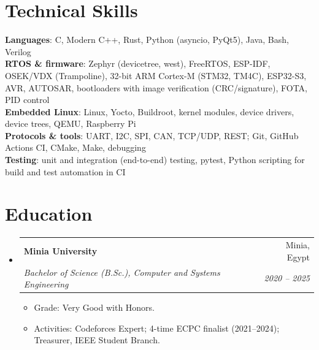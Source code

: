 \documentclass[letterpaper,11pt]{article}
\makeatletter
\newcommand{\resumeItem}[1]{
  \item\small{
    {#1 \vspace{-2pt}}
  }
}
\newcommand{\resumeSubheading}[4]{
  \vspace{-2pt}\item
    \begin{tabular*}{0.97\textwidth}[t]{l@{\extracolsep{\fill}}r}
      \textbf{#1} & #2 \\
      \textit{\small#3} & \textit{\small #4} \\
    \end{tabular*}\vspace{-7pt}
}
\newcommand{\resumeSubHeadingListStart}{\begin{itemize}[leftmargin=0.15in, label={}]}
\newcommand{\resumeSubHeadingListEnd}{\end{itemize}}
\newcommand{\resumeItemListStart}{\begin{itemize}}
\newcommand{\resumeItemListEnd}{\end{itemize}\vspace{-5pt}}
\makeatother
\begin{document}
\section{Technical Skills}
 \begin{itemize}[leftmargin=0.15in, label={}]
    \small{\item{
     \textbf{Languages}{: C, Modern C++, Rust, Python (asyncio, PyQt5), Java, Bash, Verilog} \\
     \textbf{RTOS \& firmware}{: Zephyr (devicetree, west), FreeRTOS, ESP-IDF, OSEK/VDX (Trampoline), 32-bit ARM Cortex-M (STM32, TM4C), ESP32-S3, AVR, AUTOSAR, bootloaders with image verification (CRC/signature), FOTA, PID control} \\
     \textbf{Embedded Linux}{: Linux, Yocto, Buildroot, kernel modules, device drivers, device trees, QEMU, Raspberry Pi} \\
     \textbf{Protocols \& tools}{: UART, I2C, SPI, CAN, TCP/UDP, REST; Git, GitHub Actions CI, CMake, Make, debugging} \\
     \textbf{Testing}{: unit and integration (end-to-end) testing, pytest, Python scripting for build and test automation in CI}
    }}
 \end{itemize}

\section{Education}
  \resumeSubHeadingListStart
    \resumeSubheading
      {Minia University}{Minia, Egypt}
      {Bachelor of Science (B.Sc.), Computer and Systems Engineering}{2020 -- 2025}
      \resumeItemListStart
        \resumeItem{Grade: Very Good with Honors.}
        \resumeItem{Activities: Codeforces Expert; 4-time ECPC finalist (2021--2024); Treasurer, IEEE Student Branch.}
      \resumeItemListEnd
  \resumeSubHeadingListEnd


\end{document}
